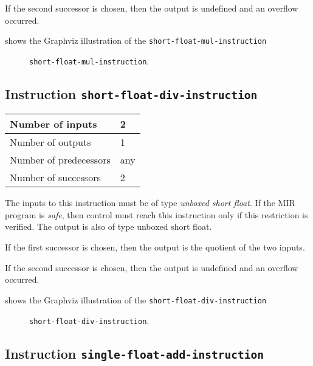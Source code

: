 If the second successor is chosen, then the output is undefined and an
overflow occurred. 

 shows the Graphviz illustration of the
\texttt{short-float-mul-instruction}

\begin{figure}
\begin{center}
\end{center}
\caption{\label{fig-short-float-mul-instruction}
\texttt{short-float-mul-instruction}.}
\end{figure}

\subsection{Instruction \texttt{short-float-div-instruction}}
\label{mir-instruction-short-float-div}

\begin{tabular}{|l|l|}
\hline
Number of inputs & 2\\
\hline
Number of outputs & 1\\
\hline
Number of predecessors & any\\
\hline
Number of successors & 2\\
\hline
\end{tabular}

The inputs to this instruction must be of type \emph{unboxed short
  float}.  If the MIR program is \emph{safe}, then control must reach
this instruction only if this restriction is verified.  The output is
also of type unboxed short float.

If the first successor is chosen, then the output is
the quotient of the two inputs.  

If the second successor is chosen, then the output is undefined and an
overflow occurred. 

 shows the Graphviz illustration of the
\texttt{short-float-div-instruction}

\begin{figure}
\begin{center}
\end{center}
\caption{\label{fig-short-float-div-instruction}
\texttt{short-float-div-instruction}.}
\end{figure}

\subsection{Instruction \texttt{single-float-add-instruction}}
\label{mir-instruction-single-float-add}

